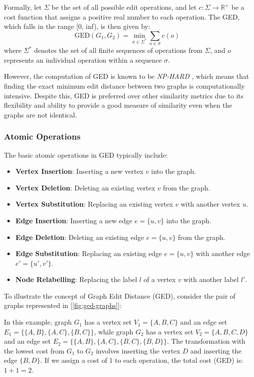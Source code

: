 \documentclass[../Thesis.tex]{subfiles}
\begin{document}
	Formally, let $\Sigma$ be the set of all possible edit operations, and let $c: \Sigma \to \mathbb{R}^+$ be a cost function that assigns a positive real number to each operation. The GED, which falls in the range [0, inf), is then given by:
	\[
	\text{GED}(G_1, G_2) = \min_{\sigma \in \Sigma^*} \sum_{o \in \sigma} c(o)
	\]
	where $\Sigma^*$ denotes the set of all finite sequences of operations from $\Sigma$, and $o$ represents an individual operation within a sequence $\sigma$.
	
	However, the computation of GED is known to be \emph{NP-HARD} \cite{complexityclasses}, which means that finding the exact minimum edit distance between two graphs is computationally intensive. Despite this, GED is preferred over other similarity metrics due to its flexibility and ability to provide a good measure of similarity even when the graphs are not identical.
	
	\subsubsection{Atomic Operations}
	
	The basic atomic operations in GED typically include:
	
	\begin{itemize}
		\item \textbf{Vertex Insertion}: Inserting a new vertex $v$ into the graph.
		\item \textbf{Vertex Deletion}: Deleting an existing vertex $v$ from the graph.
		\item \textbf{Vertex Substitution}: Replacing an existing vertex $v$ with another vertex $u$.
		\item \textbf{Edge Insertion}: Inserting a new edge $e = \{u, v\}$ into the graph.
		\item \textbf{Edge Deletion}: Deleting an existing edge $e = \{u, v\}$ from the graph.
		\item \textbf{Edge Substitution}: Replacing an existing edge $e = \{u, v\}$ with another edge $e' = \{u', v'\}$.
		\item \textbf{Node Relabelling}: Replacing the label $l$ of a vertex $v$ with another label $l'$.
	\end{itemize}
	
	To illustrate the concept of Graph Edit Distance (GED), consider the pair of graphs represented in [\autoref{fig:ged-graphs}]:
	
	In this example, graph $G_1$ has a vertex set $V_1 = \{A, B, C\}$ and an edge set $E_1 = \{\{A, B\}, \{A, C\}, \{B, C\}\}$, while graph $G_2$ has a vertex set $V_2 = \{A, B, C, D\}$ and an edge set $E_2 = \{\{A, B\}, \{A, C\}, \{B, C\}, \{B, D\}\}$. The transformation with the lowest cost from $G_1$ to $G_2$ involves inserting the vertex $D$ and inserting the edge $\{B, D\}$. If we assign a cost of 1 to each operation, the total cost (GED) is: $1+1=2$.
	
\end{document}
